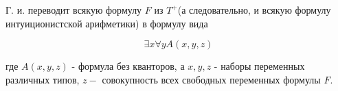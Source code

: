 \documentclass[10pt]{article}
\begin{document}
Г. и. переводит всякую формулу $F$ из $T^{+}$(а следовательно, и всякую формулу интуиционистской арифметики) в формулу вида



\[

\exists x \forall y A(x, y, z)

\]



где $A(x, y, z)$ - формула без кванторов, а $x, y, z$ - наборы переменных различных типов, $z-$ совокупность всех свободных переменных формулы $F$.
\end{document}
